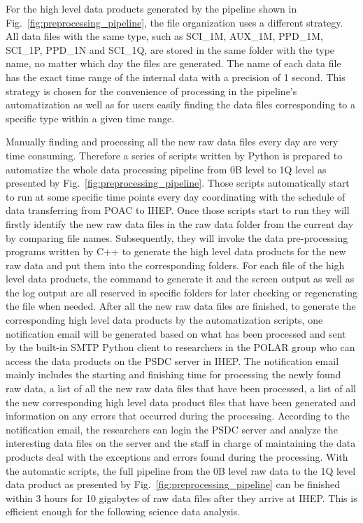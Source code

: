 \documentclass{raa}
\begin{document}
For the high level data products generated by the pipeline shown in Fig.~\ref{fig:preprocessing_pipeline}, the file organization uses a different strategy. All data files with the same type, such as SCI\_1M, AUX\_1M, PPD\_1M, SCI\_1P, PPD\_1N and SCI\_1Q, are stored in the same folder with the type name, no matter which day the files are generated. The name of each data file has the exact time range of the internal data with a precision of 1 second. This strategy is chosen for the convenience of processing in the pipeline's automatization as well as for users easily finding the data files corresponding to a specific type within a given time range.

Manually finding and processing all the new raw data files every day are very time consuming. Therefore a series of scripts written by Python is prepared to automatize the whole data processing pipeline from 0B level to 1Q level as presented by Fig.~\ref{fig:preprocessing_pipeline}. Those scripts automatically start to run at some specific time points every day coordinating with the schedule of data transferring from POAC to IHEP. Once those scripts start to run they will firstly identify the new raw data files in the raw data folder from the current day by comparing file names. Subsequently, they will invoke the data pre-processing programs written by C++ to generate the high level data products for the new raw data and put them into the corresponding folders. For each file of the high level data products, the command to generate it and the screen output as well as the log output are all reserved in specific folders for later checking or regenerating the file when needed. After all the new raw data files are finished, to generate the corresponding high level data products by the automatization scripts, one notification email will be generated based on what has been processed and sent by the built-in SMTP Python client to researchers in the POLAR group who can access the data products on the PSDC server in IHEP. The notification email mainly includes the starting and finishing time for processing the newly found raw data, a list of all the new raw data files that have been processed, a list of all the new corresponding high level data product files that have been generated and information on any errors that occurred during the processing. According to the notification email, the researchers can login the PSDC server and analyze the interesting data files on the server and the staff in charge of maintaining the data products deal with the exceptions and errors found during the processing. With the automatic scripts, the full pipeline from the 0B level raw data to the 1Q level data product as presented by Fig.~\ref{fig:preprocessing_pipeline} can be finished within 3 hours for 10 gigabytes of raw data files after they arrive at IHEP. This is efficient enough for the following science data analysis.
\end{document}
